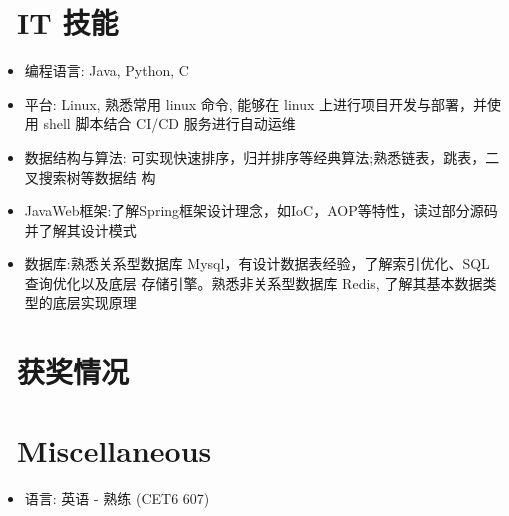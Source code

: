 \documentclass{resume}
\begin{document}
\section{\faCogs\ IT 技能}
\begin{itemize}[parsep=0.5ex]
  \item 编程语言: Java, Python, C
  \item 平台: Linux, 熟悉常用 linux 命令, 能够在 linux 上进行项目开发与部署，并使用 shell 脚本结合 CI/CD 服务进行自动运维
  \item 数据结构与算法: 可实现快速排序，归并排序等经典算法;熟悉链表，跳表，二叉搜索树等数据结 构
  \item JavaWeb框架:了解Spring框架设计理念，如IoC，AOP等特性，读过部分源码并了解其设计模式
  \item 数据库:熟悉关系型数据库 Mysql，有设计数据表经验，了解索引优化、SQL 查询优化以及底层
 存储引擎。熟悉非关系型数据库 Redis, 了解其基本数据类型的底层实现原理
\end{itemize}

\section{\faHeartO\ 获奖情况}

\section{\faInfo\ Miscellaneous}
\begin{itemize}[parsep=0.5ex]
  \item 语言: 英语 - 熟练 (CET6 607)
\end{itemize}

%
%
\end{document}
